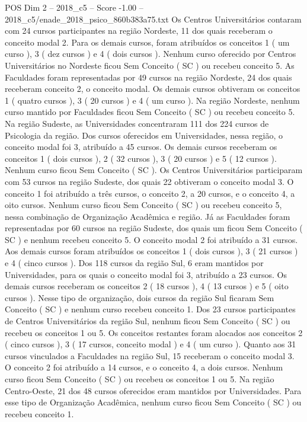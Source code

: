 \begin{textsample}{POS Dim 2 – 2018\_c5 – Score -1.00 – 2018\_c5/enade\_2018\_psico\_860b383a75.txt}
Os Centros Universitários contaram com 24 cursos participantes na região Nordeste, 11 dos quais receberam o conceito modal 2.
Para os demais cursos, foram atribuídos os conceitos 1 ( um curso ), 3 ( dez cursos ) e 4 ( dois cursos ).
Nenhum curso oferecido por Centros Universitários no Nordeste ficou Sem Conceito ( SC ) ou recebeu conceito 5.
As Faculdades foram representadas por 49 cursos na região Nordeste, 24 dos quais receberam conceito 2, o conceito modal.
Os demais cursos obtiveram os conceitos 1 ( quatro cursos ), 3 ( 20 cursos ) e 4 ( um curso ).
Na região Nordeste, nenhum curso mantido por Faculdades ficou Sem Conceito ( SC ) ou recebeu conceito 5.
Na região Sudeste, as Universidades concentraram 111 dos 224 cursos de Psicologia da região.
Dos cursos oferecidos em Universidades, nessa região, o conceito modal foi 3, atribuído a 45 cursos.
Os demais cursos receberam os conceitos 1 ( dois cursos ), 2 ( 32 cursos ), 3 ( 20 cursos ) e 5 ( 12 cursos ).
Nenhum curso ficou Sem Conceito ( SC ).
Os Centros Universitários participaram com 53 cursos na região Sudeste, dos quais 22 obtiveram o conceito modal 3.
O conceito 1 foi atribuído a três cursos, o conceito 2, a 20 cursos, e o conceito 4, a oito cursos.
Nenhum curso ficou Sem Conceito ( SC ) ou recebeu conceito 5, nessa combinação de Organização Acadêmica e região.
Já as Faculdades foram representadas por 60 cursos na região Sudeste, dos quais um ficou Sem Conceito ( SC ) e nenhum recebeu conceito 5.
O conceito modal 2 foi atribuído a 31 cursos.
Aos demais cursos foram atribuídos os conceitos 1 ( dois cursos ), 3 ( 21 cursos ) e 4 ( cinco cursos ).
Dos 118 cursos da região Sul, 6 eram mantidos por Universidades, para os quais o conceito modal foi 3, atribuído a 23 cursos.
Os demais cursos receberam os conceitos 2 ( 18 cursos ), 4 ( 13 cursos ) e 5 ( oito cursos ).
Nesse tipo de organização, dois cursos da região Sul ficaram Sem Conceito ( SC ) e nenhum curso recebeu conceito 1.
Dos 23 cursos participantes de Centros Universitários da região Sul, nenhum ficou Sem Conceito ( SC ) ou recebeu os conceitos 1 ou 5.
Os conceitos restantes foram alocados aos conceitos 2 ( cinco cursos ), 3 ( 17 cursos, conceito modal ) e 4 ( um curso ).
Quanto aos 31 cursos vinculados a Faculdades na região Sul, 15 receberam o conceito modal 3.
O conceito 2 foi atribuído a 14 cursos, e o conceito 4, a dois cursos.
Nenhum curso ficou Sem Conceito ( SC ) ou recebeu os conceitos 1 ou 5.
Na região Centro-Oeste, 21 dos 48 cursos oferecidos eram mantidos por Universidades.
Para esse tipo de Organização Acadêmica, nenhum curso ficou Sem Conceito ( SC ) ou recebeu conceito 1.

\end{textsample}
